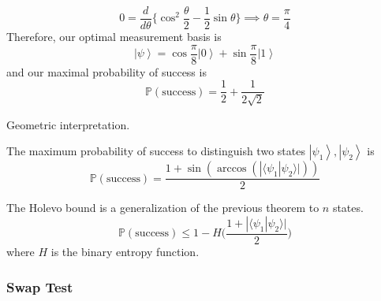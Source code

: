 \documentclass{article}
\newcommand{\ket}[1]{\ensuremath{\left|#1\right\rangle}}
\newcommand{\braket}[2]{\langle #1 | #2 \rangle}
\begin{document}
\begin{example}
      \begin{equation}
        0 = \frac{d}{d\theta} \bigg\{ \cos^2 \frac{\theta}{2} - \frac{1}{2} \sin{\theta} \bigg\} \implies  \theta = \frac{\pi}{4}
      \end{equation}
      Therefore, our optimal measurement basis is 
      \begin{equation}
        \ket{\psi} = \cos\frac{\pi}{8} \ket{0} + \sin\frac{\pi}{8} \ket{1} 
      \end{equation}
      and our maximal probability of success is 
      \begin{equation}
        \mathbb{P}(\text{success}) = \frac{1}{2} + \frac{1}{2 \sqrt{2}}
      \end{equation}
    \end{example}

    Geometric interpretation. 

    \begin{theorem}[]
      The maximum probability of success to distinguish two states $\ket{\psi_1}, \ket{\psi_2}$ is 
      \begin{equation}
        \mathbb{P}(\text{success}) = \frac{1 + \sin(\arccos(|\braket{\psi_1}{\psi_2}|))}{2}
      \end{equation}
    \end{theorem}

    \begin{theorem}
      The Holevo bound is a generalization of the previous theorem to $n$ states. 
      \begin{equation}
        \mathbb{P}(\text{success}) \leq 1 - H\bigg( \frac{1 + |\braket{\psi_1}{\psi_2}|}{2} \bigg)
      \end{equation}
      where $H$ is the binary entropy function.
    \end{theorem}

    \subsubsection{Swap Test}
\end{document}
